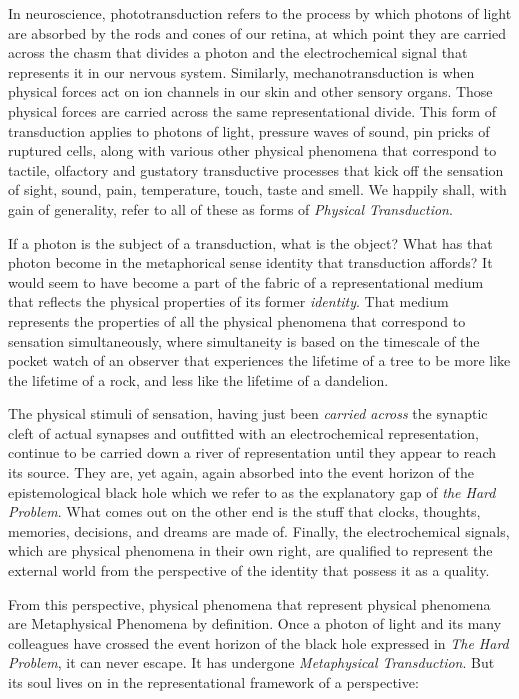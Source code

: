 \documentclass[runningheads]{llncs}
\begin{document}
In neuroscience, phototransduction refers to the process by which photons of light are absorbed by the rods and cones of our retina, at which point they are carried across the chasm that divides a photon and the electrochemical signal that represents it in our nervous system. Similarly, mechanotransduction is when physical forces act on ion channels in our skin and other sensory organs. Those physical forces are carried across the same representational divide. This form of transduction applies to photons of light, pressure waves of sound, pin pricks of ruptured cells, along with various other physical phenomena that correspond to tactile, olfactory and gustatory transductive processes that kick off the sensation of sight, sound, pain, temperature, touch, taste and smell. We happily shall, with gain of generality, refer to all of these as forms of \emph{Physical Transduction}.

If a photon is the subject of a transduction, what is the object? What has that photon become in the metaphorical sense identity that transduction affords? It would seem to have become a part of the fabric of a representational medium that reflects the physical properties of its former \emph{identity}. That medium represents the properties of all the physical phenomena that correspond to sensation simultaneously, where simultaneity is based on the timescale of the pocket watch of an observer that experiences the lifetime of a tree to be more like the lifetime of a rock, and less like the lifetime of a dandelion.

The physical stimuli of sensation, having just been \emph{carried across} the synaptic cleft of actual synapses and outfitted with an electrochemical representation, continue to be carried down a river of representation until they appear to reach its source. They are, yet again, again absorbed into the event horizon of the epistemological black hole which we refer to as the explanatory gap of \emph{the Hard Problem}. What comes out on the other end is the stuff that clocks, thoughts, memories, decisions, and dreams are made of. Finally, the electrochemical signals, which are physical phenomena in their own right, are qualified to represent the external world from the perspective of the identity that possess it as a quality.

From this perspective, physical phenomena that represent physical phenomena are Metaphysical Phenomena by definition. Once a photon of light and its many colleagues have crossed the event horizon of the black hole expressed in \emph{The Hard Problem}, it can never escape. It has undergone \emph{Metaphysical Transduction}. But its soul lives on in the representational framework of a perspective:
\end{document}
